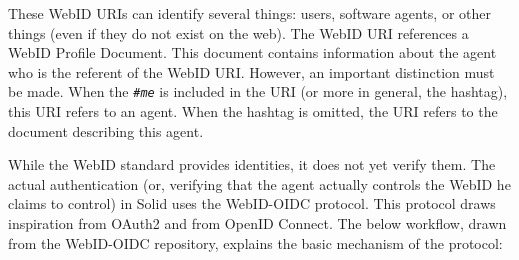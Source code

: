 \noindent These WebID URIs can identify several things: users, software agents, or other things (even if they do not exist on the web). The WebID URI references a WebID Profile Document. This document contains information about the agent who is the referent of the WebID URI. However, an important distinction must be made. When the \textit{\texttt{\#me}} is included in the URI (or more in general, the hashtag), this URI refers to an agent. When the hashtag is omitted, the URI refers to the document describing this agent.

While the WebID standard provides identities, it does not yet verify them. The actual authentication (or, verifying that the agent actually controls the WebID he claims to control) in Solid uses the WebID-OIDC protocol. This protocol draws inspiration from OAuth2 and from OpenID Connect. The below workflow, drawn from the WebID-OIDC repository, explains the basic mechanism of the protocol:


